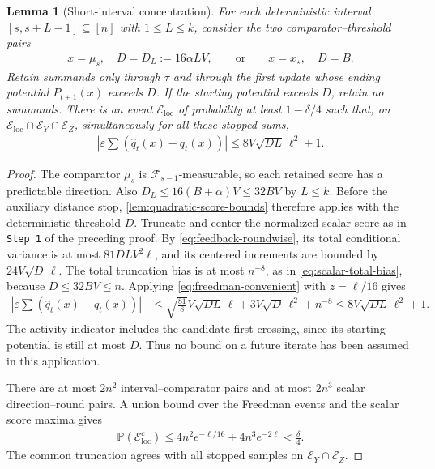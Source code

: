 \documentclass[11pt]{article}
\newtheorem{lemma}[lemma]{Lemma}
\newcommand{\Pp}{\mathbb P}
\newcommand{\F}{\mathcal F}
\newcommand{\1}{\mathbf 1}
\newcommand{\eps}{\varepsilon}
\begin{document}
\begin{lemma}[Short-interval concentration]
    \label{lem:local-concentration}
    For each deterministic interval $[s,s+L-1]\subseteq[n]$ with
    $1\leq L\leq k$, consider the two comparator--threshold pairs
    \begin{align}
        x=\mu_s,\quad D=D_L:=16\alpha LV,
        \qquad\text{or}\qquad
        x=x_\star,\quad D=B.
        \label{eq:local-threshold}
    \end{align}
    Retain summands only through $\tau$ and through the first update
    whose ending potential $P_{t+1}(x)$ exceeds $D$. If the starting
    potential exceeds $D$, retain no summands. There is an event
    $\mathcal E_{\mathrm{loc}}$ of probability at least $1-\delta/4$
    such that, on $\mathcal E_{\mathrm{loc}}\cap\mathcal E_Y\cap\mathcal E_Z$,
    simultaneously for all these stopped sums,
    \begin{align}
        \left|\eps\sum
        \left(\widehat q_t(x)-q_t(x)\right)\right|
        \leq8V\sqrt{DL}\,\ell^2+1.
        \label{eq:local-q-concentration}
    \end{align}
\end{lemma}
\begin{proof}
    The comparator $\mu_s$ is $\F_{s-1}$-measurable, so each retained
    score has a predictable direction. Also
    $D_L\leq16(B+\alpha)V\leq32BV$ by $L\leq k$.
    Before the auxiliary distance stop, \cref{lem:quadratic-score-bounds}
    therefore applies with the deterministic threshold $D$.
    Truncate and center the normalized scalar score as in
    \texttt{Step 1} of the preceding proof. By
    \eqref{eq:feedback-roundwise}, its total conditional variance is
    at most $81DLV^2\ell$, and its centered increments are bounded by
    $24V\sqrt D\,\ell$. The total truncation bias is at most $n^{-8}$,
    as in \eqref{eq:scalar-total-bias}, because $D\leq32BV\leq n$.
    Applying \eqref{eq:freedman-convenient} with $z=\ell/16$ gives
    \begin{align}
        \left|\eps\sum(\widehat q_t(x)-q_t(x))\right|
         & \leq\sqrt{\frac{81}{8}}V\sqrt{DL}\,\ell
        +3V\sqrt D\,\ell^2+n^{-8}
        \leq8V\sqrt{DL}\,\ell^2+1.
    \end{align}
    The activity indicator includes the candidate first crossing,
    since its starting potential is still at most $D$.
    Thus no bound on a future iterate has been assumed in this application.

    There are at most $2n^2$ interval--comparator pairs and at most
    $2n^3$ scalar direction--round pairs. A union bound over the
    Freedman events and the scalar score maxima gives
    \begin{align}
        \Pp(\mathcal E_{\mathrm{loc}}^c)
        \leq4n^2e^{-\ell/16}+4n^3e^{-2\ell}
        <\frac\delta4.
    \end{align}
    The common truncation agrees with all stopped samples on
    $\mathcal E_Y\cap\mathcal E_Z$.
\end{proof}
\end{document}
